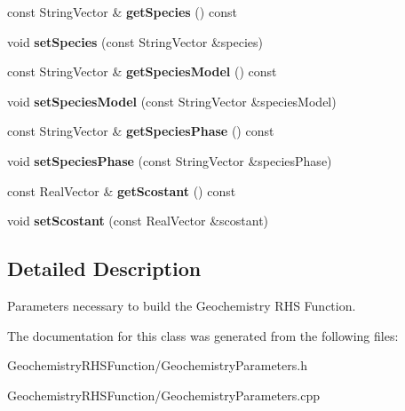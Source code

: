 \begin{DoxyCompactItemize}
\item 
\hypertarget{classGeochemistryParameters_afe5e999d8db3f175bfe233e34dc8e621}{
const StringVector \& {\bfseries getSpecies} () const }
\label{classGeochemistryParameters_afe5e999d8db3f175bfe233e34dc8e621}

\item 
\hypertarget{classGeochemistryParameters_a884ca7ffb7b3f80f7db0e995ac9c83b9}{
void {\bfseries setSpecies} (const StringVector \&species)}
\label{classGeochemistryParameters_a884ca7ffb7b3f80f7db0e995ac9c83b9}

\item 
\hypertarget{classGeochemistryParameters_a2795fdf359649341c45e86d6c7ea3831}{
const StringVector \& {\bfseries getSpeciesModel} () const }
\label{classGeochemistryParameters_a2795fdf359649341c45e86d6c7ea3831}

\item 
\hypertarget{classGeochemistryParameters_a9df2e901f16047ad6b079601b9d059ba}{
void {\bfseries setSpeciesModel} (const StringVector \&speciesModel)}
\label{classGeochemistryParameters_a9df2e901f16047ad6b079601b9d059ba}

\item 
\hypertarget{classGeochemistryParameters_a48646a5c66d883471803c3bcf8dce9fd}{
const StringVector \& {\bfseries getSpeciesPhase} () const }
\label{classGeochemistryParameters_a48646a5c66d883471803c3bcf8dce9fd}

\item 
\hypertarget{classGeochemistryParameters_a64597072499d818de8eb9d7cde120c46}{
void {\bfseries setSpeciesPhase} (const StringVector \&speciesPhase)}
\label{classGeochemistryParameters_a64597072499d818de8eb9d7cde120c46}

\item 
\hypertarget{classGeochemistryParameters_ab36064d9dbddb0d925dd4726079acb22}{
const RealVector \& {\bfseries getScostant} () const }
\label{classGeochemistryParameters_ab36064d9dbddb0d925dd4726079acb22}

\item 
\hypertarget{classGeochemistryParameters_a58c5c789c15a470822b98adc8c08012c}{
void {\bfseries setScostant} (const RealVector \&scostant)}
\label{classGeochemistryParameters_a58c5c789c15a470822b98adc8c08012c}

\end{DoxyCompactItemize}


\subsection{Detailed Description}
Parameters necessary to build the Geochemistry RHS Function. 

The documentation for this class was generated from the following files:\begin{DoxyCompactItemize}
\item 
GeochemistryRHSFunction/GeochemistryParameters.h\item 
GeochemistryRHSFunction/GeochemistryParameters.cpp\end{DoxyCompactItemize}
